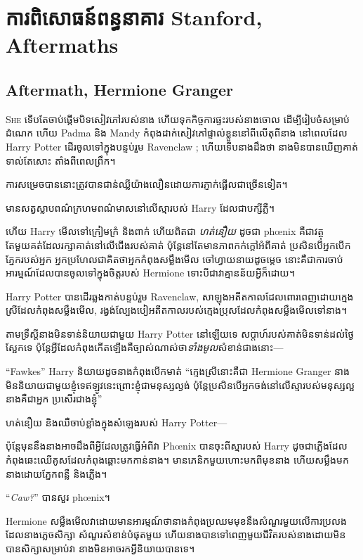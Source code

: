 \chapter{ការពិសោធន៍ពន្ធនាគារ Stanford, Aftermaths}

\section{Aftermath, Hermione Granger}

\lettrine{S}{he} ទើបតែចាប់ផ្តើមបិទសៀវភៅរបស់នាង ហើយទុកកិច្ចការផ្ទះរបស់នាងចោល ដើម្បីរៀបចំសម្រាប់ដំណេក ហើយ Padma និង Mandy កំពុងដាក់សៀវភៅផ្ទាល់ខ្លួននៅពីលើតុពីនាង នៅពេលដែល Harry Potter ដើរចូលទៅក្នុងបន្ទប់រួម Ravenclaw ; ហើយ​ទើប​នាង​ដឹង​ថា នាង​មិន​បាន​ឃើញ​គាត់​ទាល់​តែ​សោះ តាំង​ពី​ពេល​ព្រឹក។

ការ​សម្រេច​បាន​នោះ​ត្រូវ​បាន​ជាន់​ឈ្លី​យ៉ាង​លឿន​ដោយ​ការ​ភ្ញាក់​ផ្អើល​ជា​ច្រើន​ទៀត។

មានសត្វស្លាបពណ៌ក្រហមពណ៌មាសនៅលើស្មារបស់ Harry ដែលជាបក្សីភ្លឺ។

ហើយ Harry មើលទៅក្រៀមក្រំ និងពាក់ ហើយពិតជា \emph{ហត់នឿយ} ដូចជា phœnix គឺជាវត្ថុតែមួយគត់ដែលរក្សាគាត់នៅលើជើងរបស់គាត់ ប៉ុន្តែនៅតែមានភាពកក់ក្តៅអំពីគាត់ ប្រសិនបើអ្នកបើកភ្នែករបស់អ្នក អ្នកប្រហែលជាគិតថាអ្នកកំពុងសម្លឹងមើល ចៅហ្វាយនាយដូចម្ដេច នោះគឺជាការចាប់អារម្មណ៍ដែលបានចូលទៅក្នុងចិត្តរបស់ Hermione ទោះបីជាវាគ្មានន័យអ្វីក៏ដោយ។

Harry Potter បានដើរឆ្លងកាត់បន្ទប់រួម Ravenclaw, សាឡុងអតីតកាលដែលពោរពេញដោយក្មេងស្រីដែលកំពុងសម្លឹងមើល, រង្វង់ល្បែងបៀអតីតកាលរបស់ក្មេងប្រុសដែលកំពុងសម្លឹងមើលទៅនាង។

តាមទ្រឹស្តីនាងមិនទាន់និយាយជាមួយ Harry Potter នៅឡើយទេ សប្តាហ៍របស់គាត់មិនទាន់ដល់ថ្ងៃស្អែកទេ ប៉ុន្តែអ្វីដែលកំពុងកើតឡើងគឺច្បាស់ណាស់ថា\emph{ទាំងមូល}សំខាន់ជាងនោះ—

“Fawkes” Harry និយាយដូចនាងកំពុងបើកមាត់ “ក្មេងស្រីនោះគឺជា Hermione Granger នាងមិននិយាយជាមួយខ្ញុំទេឥឡូវនេះព្រោះខ្ញុំជាមនុស្សល្ងង់ ប៉ុន្តែប្រសិនបើអ្នកចង់នៅលើស្មារបស់មនុស្សល្អ នាងគឺជាអ្នក ប្រសើរជាងខ្ញុំ”

ហត់នឿយ និងឈឺចាប់ខ្លាំងក្នុងសំឡេងរបស់ Harry Potter—

ប៉ុន្តែ​មុន​នឹង​នាង​អាច​ដឹង​ពី​អ្វី​ដែល​ត្រូវ​ធ្វើ​អំពី​វា Phœnix បាន​ចុះ​ពី​ស្មា​របស់ Harry ដូច​ជា​ភ្លើង​ដែល​កំពុង​ឆេះ​ឈើ​គូស​ដែល​កំពុង​ឆ្ពោះ​មក​កាន់​នាង។ មាន​ភេនិក​មួយ​ហោះ​មក​ពី​មុខ​នាង ហើយ​សម្លឹង​មក​នាង​ដោយ​ភ្នែក​ពន្លឺ និង​ភ្លើង។

“\emph{Caw?}” បានសួរ phœnix។

Hermione សម្លឹងមើលវាដោយមានអារម្មណ៍ថានាងកំពុងប្រឈមមុខនឹងសំណួរមួយលើការប្រលងដែលនាងភ្លេចសិក្សា សំណួរសំខាន់បំផុតមួយ ហើយនាងបានទៅពេញមួយជីវិតរបស់នាងដោយមិនបានសិក្សាសម្រាប់វា នាងមិនអាចរកអ្វីនិយាយបានទេ។

